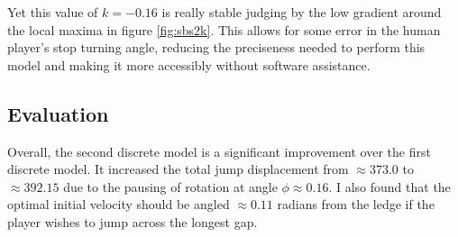 Yet this value of $k=-0.16$ is really stable judging by the low gradient around the local maxima in figure \ref{fig:sbs2k}. This allows for some error in the human player's stop turning angle, reducing the preciseness needed to perform this model and making it more accessibly without software assistance.


%
%
%
%
%

\subsection{Evaluation}
Overall, the second discrete model is a significant improvement over the first discrete model. It increased the total jump displacement from $\approx 373.0$ to $\approx 392.15$ due to the pausing of rotation at angle $\phi \approx 0.16$. I also found that the optimal initial velocity should be angled $\approx 0.11$ radians from the ledge if the player wishes to jump across the longest gap.

